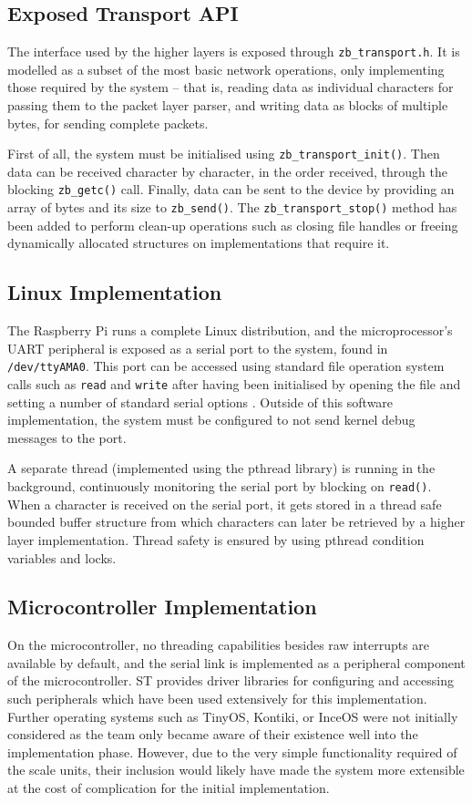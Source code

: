 \subsection{Exposed Transport API}
The interface used by the higher layers is exposed through \texttt{zb\_transport.h}. It is modelled as a subset of the most basic network operations, only implementing those required by the system -- that is, reading data as individual characters for passing them to the packet layer parser, and writing data as blocks of multiple bytes, for sending complete packets.

First of all, the system must be initialised using \texttt{zb\_transport\_init()}. Then data can be received character by character, in the order received, through the blocking \texttt{zb\_getc()} call. Finally, data can be sent to the device by providing an array of bytes and its size to \texttt{zb\_send()}. The \texttt{zb\_transport\_stop()} method has been added to perform clean-up operations such as closing file handles or freeing dynamically allocated structures on implementations that require it.

\subsection{Linux Implementation}
The Raspberry Pi runs a complete Linux distribution, and the microprocessor's UART peripheral is exposed as a serial port to the system, found in \texttt{/dev/ttyAMA0}. This port can be accessed using standard file operation system calls such as \texttt{read} and \texttt{write} after having been initialised by opening the file and setting a number of standard serial options \cite{posix-serial-programming}. Outside of this software implementation, the system must be configured to not send kernel debug messages to the port\cite{pi-tty}.

A separate thread (implemented using the pthread library) is running in the background, continuously monitoring the serial port by blocking on \texttt{read()}. When a character is received on the serial port, it gets stored in a thread safe bounded buffer structure from which characters can later be  retrieved by a higher layer implementation. Thread safety is ensured by using pthread condition variables and locks.

\subsection{Microcontroller Implementation}
On the microcontroller, no threading capabilities besides raw interrupts are available by default, and the serial link is implemented as a peripheral component of the microcontroller. ST provides driver libraries for configuring and accessing such peripherals which have been used extensively for this implementation. Further operating systems such as TinyOS, Kontiki, or InceOS were not initially considered as the team only became aware of their existence well into the implementation phase. However, due to the very simple functionality required of the scale units, their inclusion would likely have made the system more extensible at the cost of complication for the initial implementation.

